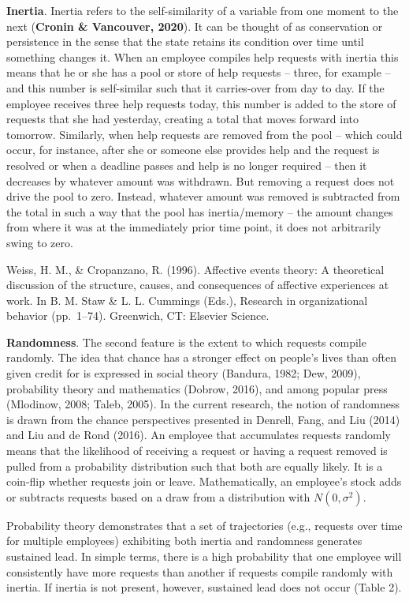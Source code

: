 \documentclass[english,,man]{apa6}
\begin{document}
\textbf{Inertia}. Inertia refers to the self-similarity of a variable from one moment to the next (\textbf{Cronin \& Vancouver, 2020}). It can be thought of as conservation or persistence in the sense that the state retains its condition over time until something changes it. When an employee compiles help requests with inertia this means that he or she has a pool or store of help requests -- three, for example -- and this number is self-similar such that it carries-over from day to day. If the employee receives three help requests today, this number is added to the store of requests that she had yesterday, creating a total that moves forward into tomorrow. Similarly, when help requests are removed from the pool -- which could occur, for instance, after she or someone else provides help and the request is resolved or when a deadline passes and help is no longer required -- then it decreases by whatever amount was withdrawn. But removing a request does not drive the pool to zero. Instead, whatever amount was removed is subtracted from the total in such a way that the pool has inertia/memory -- the amount changes from where it was at the immediately prior time point, it does not arbitrarily swing to zero.

Weiss, H. M., \& Cropanzano, R. (1996). Affective events theory: A theoretical discussion of the structure, causes, and consequences of affective experiences at work. In B. M. Staw \& L. L. Cummings (Eds.), Research in organizational behavior (pp.~1--74). Greenwich, CT: Elsevier Science.

\textbf{Randomness}. The second feature is the extent to which requests compile randomly. The idea that chance has a stronger effect on people's lives than often given credit for is expressed in social theory (Bandura, 1982; Dew, 2009), probability theory and mathematics (Dobrow, 2016), and among popular press (Mlodinow, 2008; Taleb, 2005). In the current research, the notion of randomness is drawn from the chance perspectives presented in Denrell, Fang, and Liu (2014) and Liu and de Rond (2016). An employee that accumulates requests randomly means that the likelihood of receiving a request or having a request removed is pulled from a probability distribution such that both are equally likely. It is a coin-flip whether requests join or leave. Mathematically, an employee's stock adds or subtracts requests based on a draw from a distribution with \(N(0, \sigma^2)\).

Probability theory demonstrates that a set of trajectories (e.g., requests over time for multiple employees) exhibiting both inertia and randomness generates sustained lead. In simple terms, there is a high probability that one employee will consistently have more requests than another if requests compile randomly with inertia. If inertia is not present, however, sustained lead does not occur (Table 2).
\end{document}
